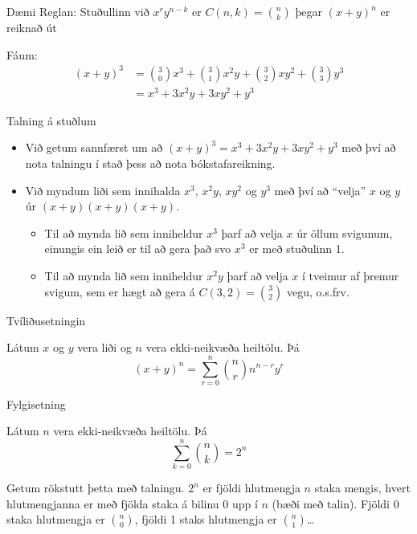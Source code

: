 \documentclass[handout]{beamer}
\begin{document}
\begin{frame}{Dæmi}
Reglan: Stuðullinn við $x^ry^{n-k}$ er $C(n,k) = \binom{n}{k}$ þegar $(x + y)^n$ er reiknað út

Fáum:
\begin{align*}
(x+y)^3 &= \binom{3}{0} x^3 + \binom{3}{1}x^2y + \binom{3}{2}xy^2 + \binom{3}{3}y^3\\
&= x^3 + 3x^2y + 3xy^2 + y^3
\end{align*}

\end{frame}

\begin{frame}{Talning á stuðlum}
\begin{itemize}
 \item Við getum sannfærst um að $(x+y)^3 = x^3 + 3x^2y + 3xy^2 + y^3$ með því að nota talningu í stað þess að nota bókstafareikning.
 \item Við myndum liði sem innihalda $x^3$, $x^2y$, $xy^2$ og $y^3$ með því að ``velja'' $x$ og $y$ úr $(x+y)(x+y)(x+y)$.
 \begin{itemize}
  \item Til að mynda lið sem inniheldur $x^3$ þarf að velja $x$ úr öllum svigunum, einungis ein leið er til að gera það svo $x^3$ er með stuðulinn 1. 
  \item Til að mynda lið sem inniheldur $x^2y$ þarf að velja $x$ í tveimur af þremur svigum, sem er hægt að gera á $C(3,2) = \binom{3}{2}$ vegu, o.s.frv.
 \end{itemize}
\end{itemize}
\end{frame}

\begin{frame}{Tvíliðusetningin}
\begin{tcolorbox}[title=Tvíliðusetningin]
Látum $x$ og $y$ vera liði og $n$ vera ekki-neikvæða heiltölu. Þá
\[
 (x + y)^n = \sum_{r=0}^n \binom{n}{r} n^{n-r} y^r
\]
\end{tcolorbox}
\end{frame}

\begin{frame}{Fylgisetning}
\begin{tcolorbox}[title=Fylgisetning tvíliðusetningarinnar]
Látum $n$ vera ekki-neikvæða heiltölu. Þá
\[
 \sum_{k=0}^n \binom{n}{k} = 2^n
\]
\end{tcolorbox}
Getum rökstutt þetta með talningu. $2^n$ er fjöldi hlutmengja $n$ staka mengis, hvert hlutmengjanna er með fjölda staka á bilinu $0$ upp í $n$ (bæði með talin). Fjöldi 0 staka hlutmengja er $\binom{n}{0}$, fjöldi 1 staks hlutmengja er $\binom{n}{1}$\ldots
\end{frame}
\end{document}
